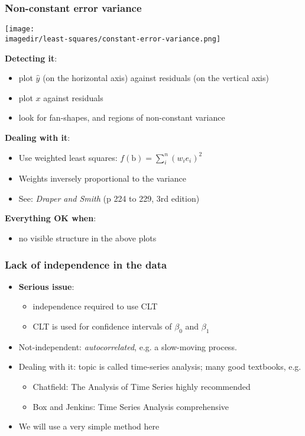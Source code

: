 \begin{frame}\frametitle{Non-constant error variance}

	\begin{center}
		\texttt{[image: \\imagedir/least-squares/constant-error-variance.png]}
	\end{center}

	\textbf{Detecting it}:
	\begin{itemize}
		\item	plot $\hat{y}$ {\scriptsize (on the horizontal axis)} against residuals {\scriptsize (on the vertical axis)}
		\item	plot $x$ against residuals
		\item	look for fan-shapes, and regions of non-constant variance
	\end{itemize}

	\textbf{Dealing with it}:
	\begin{itemize}
		\item	Use weighted least squares: $f(\mathrm{b}) = \sum_i^n{(w_ie_i)^2}$
		\item	Weights inversely proportional to the variance
		\item	See: \emph{Draper and Smith} (p 224 to 229, 3rd edition)
	\end{itemize}

	\textbf{Everything OK when}:
	\begin{itemize}
		\item	no visible structure in the above plots
	\end{itemize}
\end{frame}

\begin{frame}\frametitle{Lack of independence in the data}
	\begin{itemize}
		\item	\textbf{Serious issue}:
		\begin{itemize}
			\item	independence required to use CLT
			\item	CLT is used for confidence intervals of $\beta_0$ and $\beta_1$
		\end{itemize}
		\item	Not-independent: \emph{autocorrelated}, e.g. a slow-moving process.
		\item	Dealing with it: topic is called time-series analysis; many good textbooks, e.g. 
			\begin{itemize}
				\item	Chatfield: {\scriptsize The Analysis of Time Series} \hfill {\color{myOrange}{$\longleftarrow$}highly recommended}
				\item	Box and Jenkins: {\scriptsize Time Series Analysis} \hfill {\color{myOrange}{$\longleftarrow$}comprehensive}
			\end{itemize}
		\item	We will use a very simple method here
	\end{itemize}
\end{frame}


